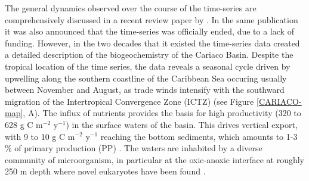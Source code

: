 The general dynamics observed over the course of the time-series are comprehensively discussed in a recent review paper by \citet{Muller-Karger2019a}. 
In the same publication it was also announced that the time-series was officially ended, due to a lack of funding. However, in the two decades that it existed the time-series data created a detailed description of the biogeochemistry of the Cariaco Basin. Despite the tropical location of the time series, the data reveals a seasonal cycle driven by upwelling along the southern coastline of the Caribbean Sea occuring usually between November and August, as trade winds intensify with the southward migration of the Intertropical Convergence Zone (ICTZ) 
(see Figure \ref{CARIACO-map}, A). The influx of nutrients provides the basis for high productivity (320 to 628 g C m$^{-2}$ y$^{-1}$) in the surface waters of the basin. This drives vertical export, with 9 to 10 g C m$^{-2}$ y$^{-1}$ reaching the bottom sediments, which amounts to 1-3 \% of primary production (PP) \citep{Muller-Karger2019a}. The waters are inhabited by a diverse community of microorganism, in particular at the oxic-anoxic interface at roughly 250 m depth where novel eukaryotes have been found \citep{Stoeck2003}. 


